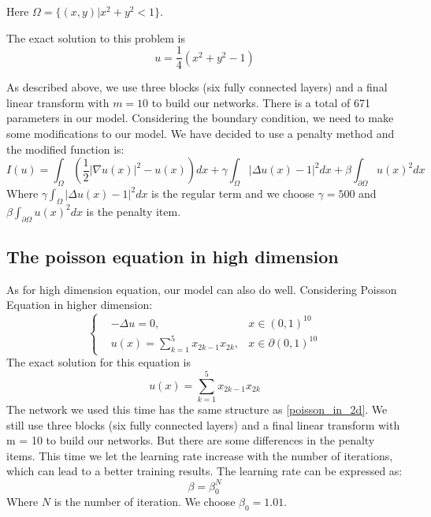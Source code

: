 \documentclass{article}
\begin{document}
Here $\Omega =\{(x,y)| x^2+y^2<1\}$.
\par The exact solution to this problem is 
\begin{equation}
u=\frac{1}{4}(x^2+y^2-1)
\end{equation}

\par As described above, we use three blocks (six fully connected layers) and a final linear transform with $m=10$ to build our networks. There is a total of 671 parameters in our model. Considering the boundary condition, we need to make some modifications to our model. We have decided to use a penalty method and the modified function is:
\begin{equation}
I(u)=\int_{\Omega}\left(\frac{1}{2}|\nabla u(x)|^2-u(x)\right)dx+\gamma\int_{\Omega}|\Delta u(x) - 1|^2dx+\beta\int_{\partial \Omega}u(x)^2dx
\end{equation}
Where $\gamma\int_{\Omega}|\Delta u(x) - 1|^2dx$ is the regular term and we choose $\gamma=500$ and $\beta\int_{\partial \Omega}u(x)^2dx$ is the penalty item.

\subsection{The poisson equation in high dimension}
As for high dimension equation, our model can also do well. Considering Poisson Equation in higher dimension:
\begin{equation}
\left \{
\begin{aligned}
&-\Delta u =0, &x\in (0,1)^{10} \\
&u(x)=\sum\limits_{k=1}^5x_{2k-1}x_{2k}, &x\in \partial (0,1)^{10}
\end{aligned}
\right.
\end{equation}
The exact solution for this equation is 
\begin{equation}
u(x)=\sum\limits_{k=1}^5x_{2k-1}x_{2k}
\end{equation}
The network we used this time has the same structure as \ref{poisson_in_2d}. We still use three blocks (six fully connected layers) and a final linear transform with m = 10 to build our networks. But there are some differences in the penalty items. This time we let the learning rate increase with the number of iterations, which can lead to a better training results. The learning rate can be expressed as:
\begin{equation}
\beta=\beta_{0}^N
\end{equation}
Where $N$ is the number of iteration. We choose $\beta_0=1.01$.
\end{document}
